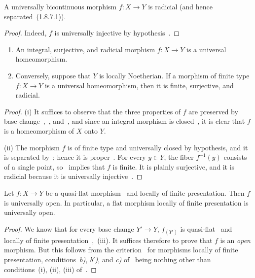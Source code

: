 \begin{proposition}[2.4.4]
\label{IV.2.4.4}
A universally bicontinuous morphism $f:X\to Y$ is radicial \textnormal{(}and hence separated~\textup{(1.8.7.1)}\textnormal{)}.
\end{proposition}

\begin{proof}
Indeed, $f$ is universally injective by hypothesis~.
\end{proof}

\begin{proposition}[2.4.5]
\label{IV.2.4.5}
\medskip\noindent
\begin{enumerate}
  \item[\textup{(i)}] An integral, surjective, and radicial morphism $f:X\to Y$ is a universal homeomorphism.
  \item[\textup{(ii)}] Conversely, suppose that $Y$ is locally Noetherian. If a morphism of finite type $f:X\to Y$ is a universal homeomorphism, then it is finite, surjective, and radicial.
\end{enumerate}
\end{proposition}

\begin{proof}
(i) It suffices to observe that the three properties of $f$ are preserved by base change~,~, and~, and since an integral morphism is closed~, it is clear that $f$ is a homeomorphism of $X$ onto $Y$.

(ii) The morphism $f$ is of finite type and universally closed by hypothesis, and it is separated by~; hence it is proper~. For every $y\in Y$, the fiber $f^{-1}(y)$ consists of a single point, so~ implies that $f$ is finite. It is plainly surjective, and it is radicial because it is universally injective~.
\end{proof}

\begin{theorem}[2.4.6]
\label{IV.2.4.6}
Let $f:X\to Y$ be a quasi-flat morphism~ and locally of finite presentation.
Then $f$ is universally open.
In particular, a flat morphism locally of finite presentation is universally open.
\end{theorem}

\begin{proof}
We know that for every base change $Y'\to Y$, $f_{(Y')}$ is quasi-flat~ and locally of finite presentation~,~(iii).
It suffices therefore to prove that $f$ is an
\emph{open} morphism.
But this follows from the criterion~ for morphisms locally of finite presentation, conditions~\emph{b)}, \emph{b$'$)}, and \emph{c)} of~ being nothing other than conditions~(i), (ii), (iii) of~.
\end{proof}

